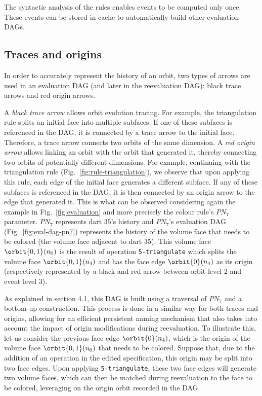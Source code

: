 The syntactic analysis of the rules enables events to be computed only once. These events can be stored in cache to automatically build other evaluation DAGs.

\subsection{Traces and origins}

In order to accurately represent the history of an orbit, two types of arrows are used in an evaluation DAG (and later in the reevaluation DAG): black trace arrows and red origin arrows. 

A \emph{black trace arrow} allows orbit evolution tracing. For example, the triangulation rule splits an initial face into multiple subfaces. If one of these subfaces is referenced in the DAG, it is connected by a trace arrow to the initial face. Therefore, a trace arrow connects two orbits of the same dimension.
A \emph{red origin arrow} allows lin\-king an orbit with the orbit that generated it, thereby connecting two orbits of potentially different dimensions. For example, continuing with the triangulation rule (Fig.~\ref{fig:rule-triangulation}), we observe that upon applying this rule, each edge of the initial face generates a different subface. If any of these subfaces is referenced in the DAG, it is then connected by an origin arrow to the edge that generated it.
This is what can be observed considering again the example in Fig.~\ref{fig:evaluation} and more pre\-ci\-se\-ly the colour rule's $PN_7$ parameter. $PN_7$ represents dart $35$'s history and $PN_7$'s evaluation DAG (Fig.~\ref{fig:eval-dag-pn7}) represents the history of the volume face that needs to be colored (the volume face ad\-ja\-cent to dart $35$).
This volume face $\orbit{0,1}(n_0)$ is the result of %
operation \verb+5-triangulate+ 
which splits the volume face $\orbit{0,1}(n_4)$ and has the face edge $\orbit{0}(n_4)$ as its origin (respectively represented by a black and red arrow between orbit level 2 and event level 3).

As explained in section 4.1, this DAG is built using a  traversal of $PN_7$ and a bottom-up construction. This process is done in a similar way for both traces and origins, allowing for an efficient persistent naming mechanism that also takes into account the im\-pact of origin modifications during reevaluation.
To illustrate this, let us consider the previous face edge $\orbit{0}(n_4)$, which is the origin of the volume face $\orbit{0,1}(n_0)$ that needs to be colored. Suppose that, due to the addition of an operation in the edited specification, this origin %
may be 
split into two face edges. Upon applying %
\verb+5-triangulate+,
these two face edges will generate two volume faces, which can then be matched during reevaluation to the face to be colored, leveraging on the  origin orbit recorded in the DAG.

